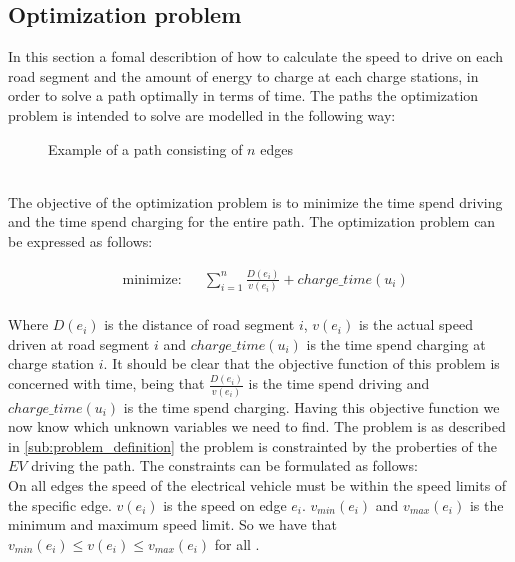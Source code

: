 \subsection{Optimization problem}
In this section a fomal describtion of how to calculate the speed to drive on each road segment and the amount of energy to charge at each charge stations, in order to solve a path optimally in terms of time. The paths the optimization problem is intended to solve are modelled in the following way: \\
\begin{figure}[h!]
\centering
    \caption{Example of a path consisting of $n$ edges} \label{fig:pathexample}
\end{figure} \\

The objective of the optimization problem is to minimize the time spend driving 
and the time spend charging for the entire path. The optimization problem can be expressed as follows:

\begin{equation}
	\begin{aligned} & 
	{\text{minimize:}}
	& & \sum_{i=1}^{n} \frac{D(e_i)}{v(e_i)} + charge\_time(u_i) \\
	\end{aligned}
\end{equation}\label{eq:objfunction}

Where $D(e_i)$ is the distance of road segment $i$, $v(e_i)$ is the actual speed driven at road segment $i$ and $charge\_time(u_i)$ is the time spend charging at charge station $i$. It should be clear that the objective function of this problem is concerned with time, being that $\frac{D(e_i)}{v(e_i)}$ is the time spend driving and $charge\_time(u_i)$ is the time spend charging. Having this objective function we now know which unknown variables we need to find. The problem is as described in \cref{sub:problem_definition} the problem is constrainted by the proberties of the $EV$ driving the path.  
The constraints can be formulated as follows: \\
On all edges the speed of the electrical vehicle must be within the speed limits of the specific edge. $v(e_i)$ is the speed on edge $e_i$. $v_{min}(e_i)$ and $v_{max}(e_i)$ is the minimum and maximum speed limit. So we have that $v_{min}(e_i) \leq v(e_i) \leq v_{max}(e_i)$ for all .
 
